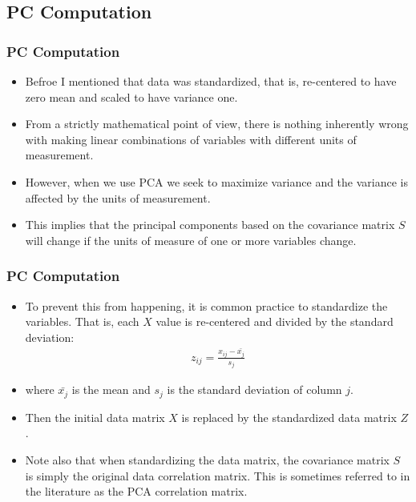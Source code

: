 \documentclass[
  shownotes,
  xcolor={svgnames},
  hyperref={colorlinks,citecolor=DarkBlue,linkcolor=DarkRed,urlcolor=DarkBlue}
  , aspectratio=169]{beamer}
\begin{document}
\subsection{PC Computation}
\begin{frame}[fragile]
\frametitle{PC Computation}

\begin{itemize}

\item Befroe I mentioned that  data was standardized, that is, re-centered to have zero mean and scaled to have variance one. 
\medskip
\item From a strictly mathematical point of view, there is nothing inherently wrong with making linear combinations of variables with different units of measurement. 
\medskip
\item However, when we use PCA we seek to maximize variance and the variance is affected by the units of measurement. 
\medskip
\item This implies that the principal components based on the covariance matrix $ S $ will change if the units of measure of one or more variables change. 


\end{itemize}


\end{frame}
\begin{frame}[fragile]
\frametitle{PC Computation}

\begin{itemize}
  \item To prevent this from happening, it is common practice to standardize the variables. That is, each $ X $ value is re-centered and divided by the standard deviation:
  \medskip
    \begin{align}
      z_{ij}=\frac{x_{ij}-\bar{x_j}}{s_j}
    \end{align}
  \medskip
  \item  where $\bar{x_j}$ is the mean and ${s_j}$ is the standard deviation of column $j$. 
  \medskip
  \item Then the initial data matrix $ X $ is replaced by the standardized data matrix $ Z $.
  \medskip
  \item Note also that when standardizing the data matrix, the covariance matrix $ S $ is simply the original data correlation matrix. This is sometimes referred to in the literature as the PCA correlation matrix.
\end{itemize}

\end{frame}
\end{document}

